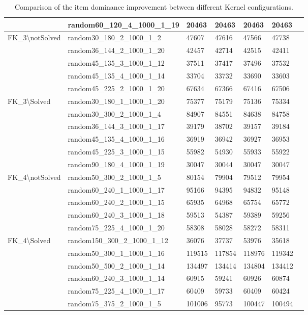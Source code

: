\begin{table}[!htbp]
{\begin{tabular}{@{}lllllll@{}}
            & random60\_120\_4\_1000\_1\_19 &20463   &20463  &20463  &20463\\
            \midrule
            \multirow{5}{*}{FK\_3\textbackslash notSolved} 
            & random30\_180\_2\_1000\_1\_2 &47607  &47616  &47566  &47738\\  
            & random36\_144\_2\_1000\_1\_20 &42457   &42714  &42515  &42411\\  
            & random45\_135\_3\_1000\_1\_12 &37511   &37417  &37496  &37532\\  
            & random45\_135\_4\_1000\_1\_14 &33704   &33732  &33690  &33603\\  
            & random45\_225\_2\_1000\_1\_20 &67634  &67366  &67416  &67506\\ 
            \midrule
            \multirow{6}{*}{FK\_3\textbackslash Solved}
            & random30\_180\_1\_1000\_1\_20 &75377  &75179  &75136  &75334\\  
            & random30\_300\_2\_1000\_1\_4 &84907  &84551  &84638  &84758\\  
            & random36\_144\_3\_1000\_1\_17 &39179  &38702  &39157  &39184\\  
            & random45\_135\_4\_1000\_1\_16 &36919  &36942  &36927  &36953\\  
            & random45\_225\_3\_1000\_1\_15 &55982  &54930  &55933  &55922\\  
            & random90\_180\_4\_1000\_1\_19 &30047  &30044  &30047  &30047\\  
            \midrule
            \multirow{5}{*}{FK\_4\textbackslash notSolved}
            & random50\_300\_2\_1000\_1\_5 &80154  &79904  &79512 &79954\\  
            & random60\_240\_1\_1000\_1\_17 &95166  &94395  &94832  &95148\\  
            & random60\_240\_2\_1000\_1\_15 &65935  &64968  &65754  &65772\\  
            & random60\_240\_3\_1000\_1\_18 &59513  &54387  &59389  &59256\\  
            & random75\_225\_4\_1000\_1\_20 &58308  &58028  &58272  &58311\\ 
            \midrule
            \multirow{6}{*}{FK\_4\textbackslash Solved}
            & random150\_300\_2\_1000\_1\_12 &36076  &37737  &53976  &35618\\  
            & random50\_300\_1\_1000\_1\_16 &119515   &117854  &118976  &119342\\  
            & random50\_500\_2\_1000\_1\_14 &134497   &134414  &134804  &134412\\  
            & random60\_240\_3\_1000\_1\_14   &60915  &59241  &60926 &60874\\  
            & random75\_225\_4\_1000\_1\_17 &60409  &59733  &60409  &60424\\  
            & random75\_375\_2\_1000\_1\_5 &101006   &95773  &100447  &100494\\ 
            \bottomrule
        \end{tabular}
        }
    \caption{Comparison of the item dominance improvement between different Kernel configurations.}
    \label{tab:comp_item_dom}
\end{table}
